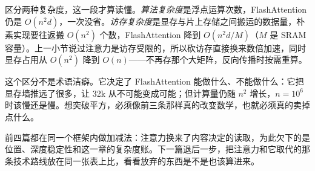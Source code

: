 区分两种复杂度，这一段才算读懂。\emph{算法复杂度}是浮点运算次数，FlashAttention 仍是 \(O(n^2d)\)，一次没省。\emph{访存复杂度}是显存与片上存储之间搬运的数据量，朴素实现要往返搬 \(O(n^2)\) 个数，FlashAttention 降到 \(O(n^2 d/M)\)（\(M\) 是 SRAM 容量）。上一小节说过注意力是访存受限的，所以砍访存直接换来数倍加速，同时显存占用从 \(O(n^2)\) 降到 \(O(n)\)——不再存那个大矩阵，反向传播时按需重算。

这个区分不是术语洁癖。它决定了 FlashAttention 能做什么、不能做什么：它把显存墙推远了很多，让 32k 从不可能变成可能；但计算量仍随 \(n^2\) 增长，\(n=10^6\) 时该慢还是慢。想突破平方，必须像前三条那样真的改变数学，也就必须真的卖掉点什么。

前四篇都在同一个框架内做加减法：注意力换来了内容决定的读取，为此欠下的是位置、深度稳定性和这一章的复杂度账。下一篇退后一步，把注意力和它取代的那条技术路线放在同一张表上比，看看放弃的东西是不是也该算进来。

